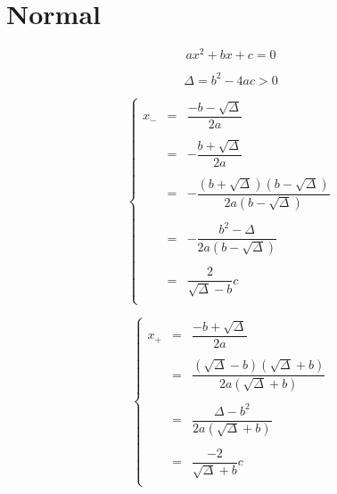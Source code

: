 \documentclass[aps,12pt]{revtex4}
\begin{document}
\section{Normal}

$$ax^2+bx+c=0$$

$$
\Delta = b^2-4ac > 0
$$	

$$
\left\lbrace
\begin{array}{rcl}
	x_- & = &  \dfrac{-b-\sqrt{\Delta}}{2a} \\
	\\
	& = & -  \dfrac{b+\sqrt{\Delta}}{2a} \\
	\\
	& = & -  \dfrac{(b+\sqrt{\Delta})(b-\sqrt{\Delta})}{2a(b-\sqrt{\Delta})}\\
	\\
	& = & - \dfrac{b^2-\Delta}{2a(b-\sqrt{\Delta})}\\
	\\
	& = & \dfrac{2}{\sqrt{\Delta}-b} c\\ 
\end{array}
\right.
$$

$$
\left\lbrace
\begin{array}{rcl}
	x_+ & = &  \dfrac{-b+\sqrt{\Delta}}{2a} \\
	\\
	 & = & \dfrac{(\sqrt{\Delta}-b)(\sqrt{\Delta}+b)}{2a(\sqrt{\Delta}+b)}\\
	\\
	& = & \dfrac{\Delta-b^2}{2a(\sqrt{\Delta}+b)}\\
	\\
	& = & \dfrac{-2}{\sqrt{\Delta}+b}c\\
\end{array}
\right.
$$
\end{document}
